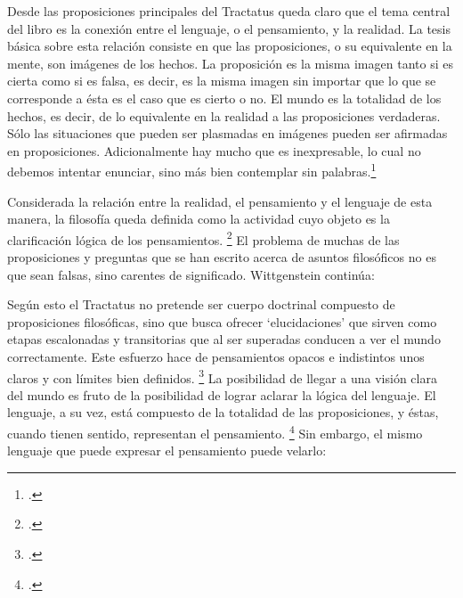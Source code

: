 Desde las proposiciones principales del
Tractatus queda claro que el tema central del libro es la conexión entre el
lenguaje, o el pensamiento, y la realidad. La tesis básica sobre esta relación
consiste en que las proposiciones, o su equivalente en la mente, son imágenes
de los hechos. La proposición es la misma imagen tanto si es cierta como si es
falsa, es decir, es la misma imagen sin importar que lo que se corresponde a
ésta es el caso que es cierto o no. El mundo es la totalidad de los hechos, es
decir, de lo equivalente en la realidad a las proposiciones verdaderas. Sólo las
situaciones que pueden ser plasmadas en imágenes pueden ser afirmadas en
proposiciones. Adicionalmente hay mucho que es inexpresable, lo cual no debemos
intentar enunciar, sino más bien contemplar sin palabras.\footcite[cf.
p.19]{IWT} 

Considerada la relación entre la
realidad, el pensamiento y el lenguaje de esta manera, la filosofía queda
definida como la actividad cuyo objeto es la clarificación lógica de los
pensamientos. \footcite[4.112 p. 52]{tractatus} El problema de muchas de las
proposiciones y preguntas que se han escrito acerca de asuntos filosóficos no es
que sean falsas, sino carentes de significado. Wittgenstein continúa:  

Según esto el Tractatus no pretende ser cuerpo doctrinal compuesto de
proposiciones filosóficas, sino que busca ofrecer `elucidaciones' que sirven
como etapas escalonadas y transitorias que al ser superadas conducen a ver el
mundo correctamente. Este esfuerzo hace de pensamientos opacos e indistintos
unos claros y con límites bien definidos. \footcite[cf. 4.112 y 6.54]{tractatus}
La posibilidad de llegar a una visión clara del mundo es fruto de la posibilidad
de lograr aclarar la lógica del lenguaje. El lenguaje, a su vez, está
compuesto de la totalidad de las proposiciones, y éstas, cuando tienen sentido,
representan el pensamiento. \footcite[cf. 4 y 4.001]{tractatus} Sin embargo, el
mismo lenguaje que puede expresar el pensamiento puede velarlo: 

